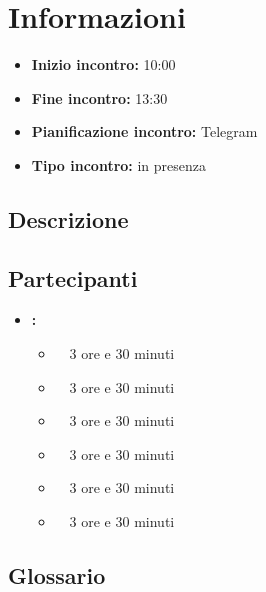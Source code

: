 \section{Informazioni}
\begin{itemize}
	\item \textbf{Inizio incontro:} 10:00
	\item \textbf{Fine incontro:} 13:30
	\item \textbf{Pianificazione incontro:} Telegram
	\item \textbf{Tipo incontro:} in presenza
\end{itemize}

\subsection{Descrizione}
\DocDescription

\subsection{Partecipanti}

\begin{itemize}
	\item \textbf{\GroupName:}
	\begin{itemize}
		\item \tommaso \ \rightarrow\ 3 ore e 30 minuti
		\item \marco \ \rightarrow\ 3 ore e 30 minuti
		\item \riccardo \ \rightarrow\ 3 ore e 30 minuti
		\item \raul \ \rightarrow\ 3 ore e 30 minuti
		\item \martina \ \rightarrow\ 3 ore e 30 minuti
		\item \sebastiano \ \rightarrow\ 3 ore e 30 minuti
	\end{itemize}
\end{itemize}

\subsection{Glossario}
\GlossarioIntroduzione

\clearpage